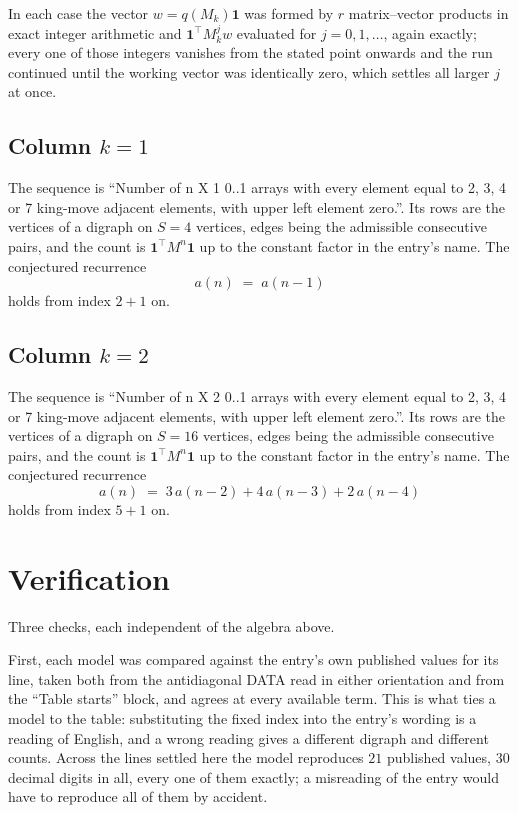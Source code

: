 \documentclass[11pt,a4paper]{article}
\theoremstyle{plain}
\theoremstyle{definition}
\begin{document}
In each case the vector $w=q(M_k)\mathbf{1}$ was formed by $r$ matrix--vector products in
exact integer arithmetic and $\mathbf{1}^{\!\top}M_k^{j}w$ evaluated for $j=0,1,\dots$,
again exactly; every one of those integers vanishes from the stated point onwards and the run
continued until the working vector was identically zero, which settles all larger $j$ at once.

\subsection*{Column $k$$=1$}
The sequence is ``Number of n X 1 0..1 arrays with every element equal to 2, 3, 4 or 7 king-move adjacent elements, with upper left element zero.''. Its rows are the vertices of a digraph on
$S=4$ vertices, edges being the admissible consecutive pairs, and the count is
$\mathbf{1}^{\!\top}M^{n}\mathbf{1}$ up to the constant factor in the entry's name.
The conjectured recurrence
\[
a(n)\;=\;a(n-1)
\]
holds from index $2+1$ on.

\subsection*{Column $k$$=2$}
The sequence is ``Number of n X 2 0..1 arrays with every element equal to 2, 3, 4 or 7 king-move adjacent elements, with upper left element zero.''. Its rows are the vertices of a digraph on
$S=16$ vertices, edges being the admissible consecutive pairs, and the count is
$\mathbf{1}^{\!\top}M^{n}\mathbf{1}$ up to the constant factor in the entry's name.
The conjectured recurrence
\[
a(n)\;=\;3\,a(n-2) + 4\,a(n-3) + 2\,a(n-4)
\]
holds from index $5+1$ on.

\section{Verification}

Three checks, each independent of the algebra above.

First, each model was compared against the entry's own published values for its line, taken
both from the antidiagonal DATA read in either orientation and from the ``Table starts''
block, and agrees at every available term. This is what ties a model to the table:
substituting the fixed index into the entry's wording is a reading of English, and a wrong
reading gives a different digraph and different counts. Across the lines settled here the
model reproduces $21$ published values, $30$ decimal digits in all, every one of
them exactly; a misreading of the entry would have to reproduce all of them by accident.
\end{document}
